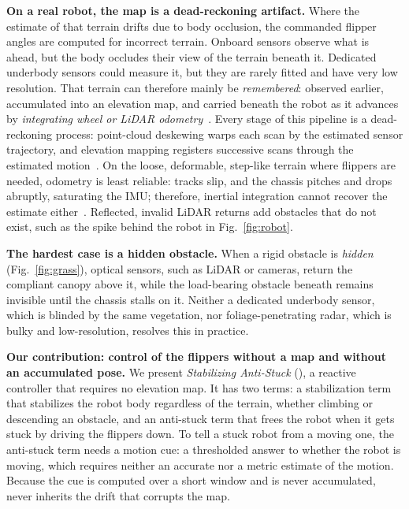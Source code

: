 \textbf{On a real robot, the map is a dead-reckoning artifact.}
Where the estimate of that terrain drifts due to body occlusion, the commanded flipper
angles are computed for incorrect terrain. Onboard sensors
observe what is ahead, but the body occludes their view of the terrain beneath it.
Dedicated underbody sensors could measure it, but they are rarely fitted and have very
low resolution. That terrain can therefore mainly be \emph{remembered}: observed earlier, accumulated into an elevation
map, and carried beneath the robot as it advances by
\emph{integrating wheel or LiDAR odometry}~\cite{fankhauser2018}. Every stage of this
pipeline is a dead-reckoning process: point-cloud deskewing warps each scan by the estimated
sensor trajectory, and elevation mapping registers successive scans through the
estimated motion~\cite{loam2014}. On the loose, deformable,
step-like terrain where flippers are needed, odometry is least reliable: tracks slip, and
the chassis pitches and drops abruptly, saturating the IMU; therefore, inertial integration cannot
recover the estimate either~\cite{woodman2007imu}. Reflected, invalid LiDAR returns add obstacles that do
not exist, such as the spike behind the robot in Fig.~\ref{fig:robot}.

\textbf{The hardest case is a hidden obstacle.}
When a rigid obstacle is \emph{hidden} (Fig.~\ref{fig:grass}), optical sensors, such as LiDAR or cameras, return the
compliant canopy above it, while the load-bearing obstacle beneath remains invisible until the
chassis stalls on it. Neither a dedicated underbody sensor, which is blinded by the same vegetation, nor foliage-penetrating radar, which is bulky and low-resolution, resolves this in practice.

\textbf{Our contribution: control of the flippers without a map and without an accumulated
pose.}
We present \emph{Stabilizing Anti-Stuck} (\SAS), a reactive controller that requires no
elevation map. It has two terms: a
stabilization term that stabilizes the robot body regardless of the terrain, whether
climbing or descending an obstacle, and an anti-stuck term that frees the robot when it
gets stuck by driving the flippers down. To tell a stuck robot from a moving one, the
anti-stuck term needs a motion cue: a thresholded answer to whether the robot is
moving, which requires neither an accurate nor a metric estimate of the motion. Because the
cue is computed over a short window and is never accumulated, \SAS{} never inherits the drift that corrupts the map. 


